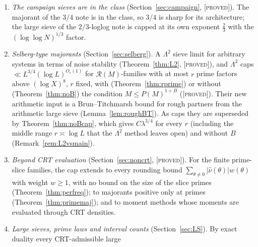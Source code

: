 \documentclass[10pt,reqno]{amsart}
\theoremstyle{definition}
\theoremstyle{remark}
\newcommand{\cR}{\mathscr R}
\newcommand{\lab}[1]{\textup{[\textsc{#1}]}}
\begin{document}
\begin{enumerate}
  (Section~\ref{sec:noB}): a base of unit squares, which avoids every
  small class because no $\cR(M)$-, $(a,D)$- or Case-A class contains a
  square (Lemmas~\ref{lem:nosquare} and~\ref{lem:squarebase}); first
  moments over all moduli with no loss, from the local weight
  $Z_y(m)=\sum_{p^\nu\mid m,\,p^\nu\leq y}\Lambda(p^\nu)/\log y$, which is $\geq u/2$ on
  $y$-smooth $m\approx y^u$ and has bounded moments, so that its fourth moment
  reduces smooth sums to congruences modulo small numbers, where Shiu's
  theorem (for $\cR(M)$) and Elsholtz--Tao \S7 (for Case A, split by the
  size of $r$) apply (Lemmas~\ref{lem:localweight}--\ref{lem:firstnoB});
  and second moments by Rankin's trick and Cauchy--Schwarz
  (Lemma~\ref{lem:secondnoB}).
\item \emph{The campaign sieves are in the class}
  (Section~\ref{sec:campaign}, \lab{proved}).  The majorant of the $3/4$
  note is in the class, so $3/4$ is sharp for its architecture; the
  large sieve of the $2/3$-loglog note is capped at its own exponent
  $\frac23$ with the $(\log\log N)^{1/3}$ factor.
\item \emph{Selberg-type majorants} (Section~\ref{sec:selberg}).  A
  $\Lambda^2$ sieve limit for arbitrary systems in terms of noise
  stability (Theorem~\ref{thm:L2}, \lab{proved}), and $\Lambda^2$ caps
  $\ll L^{3/4}(\log L)^{O_r(1)}$ for $\cR(M)$-families with at most $r$
  prime factors above $(\log X)^8$, $r$ fixed, with
  (Theorem~\ref{thm:rprime}) or without (Theorem~\ref{thm:noB}) the
  condition $M\leq P(M)^{1+B}$ (\lab{proved}).  Their new arithmetic input
  is a Brun--Titchmarsh bound for rough partners from the arithmetic
  large sieve (Lemma~\ref{lem:roughBT}).  As caps they are superseded by
  Theorem~\ref{thm:noBcap}, which gives $C\lambda^{3/4}$ for every $r$ (including
  the middle range $r\asymp\log L$ that the $\Lambda^2$ method leaves open) and
  without $B$ (Remark~\ref{rem:L2vsmain}).
\item \emph{Beyond CRT evaluation} (Section~\ref{sec:noncrt},
  \lab{proved}).  For the finite prime-slice families, the cap extends
  to every rounding bound $\sum_{\theta\neq0}|\hat\nu(\theta)|w(\theta)$ with
  weight $w\geq1$, with no bound on the size of the slice primes
  (Theorem~\ref{thm:perfreq}); to majorants positive only at primes
  (Theorem~\ref{thm:primemaj}); and to moment methods whose moments are
  evaluated through CRT densities.
\item \emph{Large sieves, prime laws and interval counts}
  (Section~\ref{sec:LS}).  By exact duality every CRT-admissible large

\end{enumerate}
\end{document}
